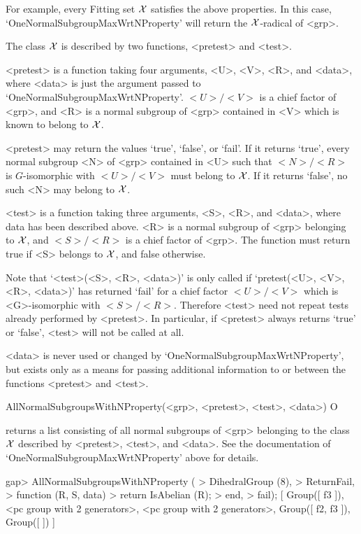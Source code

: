For example, every Fitting set $\cal X$ satisfies the above properties. In
this case, `OneNormalSubgroupMaxWrtNProperty' will return the $\cal
X$-radical of <grp>.

The class $\cal X$ is described by two functions, <pretest> and <test>. 

<pretest> is a function taking four arguments, <U>, <V>, <R>, and <data>,
where <data> is just the argument passed to
`OneNormalSubgroupMaxWrtNProperty'. $<U>/<V>$ is a chief factor of <grp>,
and  <R> is a normal subgroup of <grp> contained in <V> which is known to
belong to
$\cal X$.

<pretest> may return the values `true', `false', or `fail'. If it returns 
`true', every normal subgroup <N> of <grp> contained in <U> such that
$<N>/<R>$ is 
$G$-isomorphic with $<U>/<V>$ must belong to $\cal X$. If it returns `false',
no such <N> may belong to $\cal X$. 

<test> is a function taking three arguments, <S>, <R>, and <data>, where
data has been described above. <R> is a normal subgroup of <grp> belonging to
$\cal X$, and $<S>/<R>$ is a chief factor of <grp>. The function must return
true if <S> belongs to $\cal X$, and false otherwise. 

Note that `<test>(<S>, <R>, <data>)' is only called if `pretest(<U>, <V>,
<R>, <data>)' has returned `fail' for a chief factor $<U>/<V>$ which is
<G>-isomorphic with $<S>/<R>$. Therefore <test> need not repeat tests
already performed by <pretest>. In particular, if <pretest> always returns
`true' or `false', <test> will not be called at all.

<data> is never used or changed by `OneNormalSubgroupMaxWrtNProperty', but
exists only as a means for passing additional information to or between
the functions <pretest> and <test>.


\>AllNormalSubgroupsWithNProperty(<grp>, <pretest>, <test>, <data>) O

returns a list consisting of all normal subgroups of <grp> belonging 
to the class $\cal X$ described by <pretest>, <test>, and <data>. See
the documentation of `OneNormalSubgroupMaxWrtNProperty' above for details.

\beginexample
gap> AllNormalSubgroupsWithNProperty (
> DihedralGroup (8),
>     ReturnFail,
>     function (R, S, data)
>         return IsAbelian (R);
>     end,
>     fail);
[ Group([ f3 ]), <pc group with 2 generators>, <pc group with 2 generators>,
  Group([ f2, f3 ]), Group([  ]) ]
\endexample

